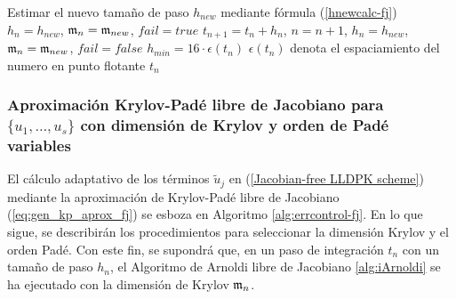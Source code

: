 {\begin{algorithm}[htb]
{			Estimar el nuevo tamaño de paso $h_{new}$ mediante fórmula (\ref{hnewcalc-fj}) \\
			{
				{
					$h_n=h_{new}$, $\mathfrak{m}_n = \mathfrak{m}_{new}$, $fail = true$
				}
				{$t_{n+1}=t_n+h_n$, $n=n+1$, $h_n=h_{new}$, $\mathfrak{m}_n = \mathfrak{m}_{new}$, $fail=false$}
			}
			$h_{min}=16 \cdot \epsilon(t_n)$
		}
		\nonl $\epsilon(t_n)$ denota el espaciamiento del numero en punto flotante $t_n$
\end{algorithm}}


\subsubsection{Aproximación Krylov-Padé libre de Jacobiano para $\{ u_1,\ldots, u_s \}$ con dimensión de Krylov y orden de Padé variables}

El cálculo adaptativo de los términos $\widetilde{u}_j$ en (\ref{Jacobian-free LLDPK scheme}) mediante la aproximación de Krylov-Padé libre de Jacobiano (\ref{eq:gen_kp_aprox_fj}) se esboza en Algoritmo \ref{alg:errcontrol-fj}. En lo que sigue, se describirán los procedimientos para seleccionar la dimensión Krylov y el orden Padé. Con este fin, se supondrá que, en un paso de integración $t_n$ con un tamaño de paso $h_n$, el Algoritmo de Arnoldi libre de Jacobiano \ref{alg:iArnoldi} se ha ejecutado con la dimensión de Krylov $\mathfrak{m}_n$. 

